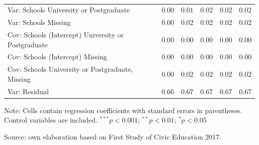 \documentclass[
  12pt,
  letterpaper,
]{article}
\begin{document}
\begin{table}
{\begin{center}
{\begin{threeparttable}
\begin{tabular}{l c c c c c}
Var: Schools University or Postgraduate             & $0.00$        & $0.01$        & $0.02$        & $0.02$        & $0.02$        \\
Var: Schools Missing                                & $0.00$        & $0.02$        & $0.02$        & $0.02$        & $0.02$        \\
Cov: Schools (Intercept) University or Postgraduate & $0.00$        & $0.00$        & $0.00$        & $0.00$        & $0.00$        \\
Cov: Schools (Intercept) Missing                    & $0.00$        & $0.00$        & $0.00$        & $0.00$        & $0.00$        \\
Cov: Schools University or Postgraduate, Missing    & $0.00$        & $0.02$        & $0.02$        & $0.02$        & $0.02$        \\
Var: Residual                                       & $0.66$        & $0.67$        & $0.67$        & $0.67$        & $0.67$        \\
\bottomrule
\end{tabular}
\begin{tablenotes}[flushleft]
\scriptsize{\item Note: Cells contain regression coefficients with standard errors in parentheses. Control variables are included. $^{***}p<0.001$; $^{**}p<0.01$; $^{*}p<0.05$ \\ \item Source: own elaboration based on First Study of Civic Education 2017.}
\end{tablenotes}
\end{threeparttable}
}
\caption{}
\label{table:coefficients}
\end{center}

}

\end{table}%
\end{document}
